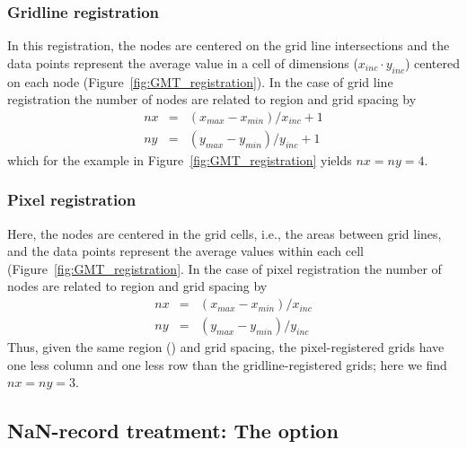 \subsubsection{Gridline registration}

In this registration, the nodes are centered on the grid line
intersections and the data points represent the average value
in a cell of dimensions ($x_{inc} \cdot y_{inc}$) centered on each
node (Figure~\ref{fig:GMT_registration}).
In the case of grid line registration the number of nodes are
related to region and grid spacing by \\

\[ \begin{array}{ccl}
nx & =  &       (x_{max} - x_{min}) / x_{inc} + 1       \\
ny & =  &       (y_{max} - y_{min}) / y_{inc} + 1
\end{array} \]
which for the example in Figure~\ref{fig:GMT_registration} yields $nx = ny = 4$.



\subsubsection{Pixel registration}

Here, the nodes are centered in the grid cells, i.e., the areas
between grid lines, and the data points represent the average
values within each cell (Figure~\ref{fig:GMT_registration}.
In the case of pixel registration the number of nodes are related
to region and grid spacing by \\

\[ \begin{array}{ccl}
nx & =  &       (x_{max} - x_{min}) / x_{inc}   \\
ny & =  &       (y_{max} - y_{min}) / y_{inc}
\end{array} \]
Thus, given the same region () and grid spacing, the pixel-registered grids have one less
column and one less row than the gridline-registered grids; here we
find $nx = ny = 3$.


\subsection{NaN-record treatment: The  option}

